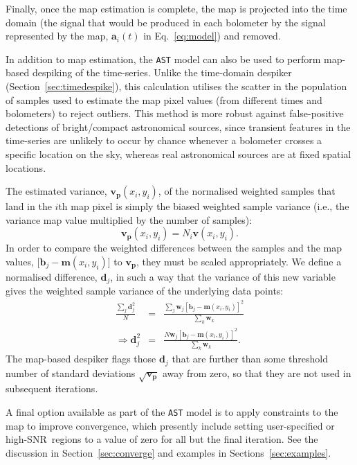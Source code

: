 \documentclass[useAMS,usenatbib,nofootinbib]{mn2e}
\newcommand{\snr}{SNR}
\newcommand{\model}[1]{\texttt{#1}}
\begin{document}
Finally, once the map estimation is complete, the map is projected
into the time domain (the signal that would be produced in each
bolometer by the signal represented by the map, $\mathbf{a}_i(t)$ in
Eq.~\ref{eq:model}) and removed.

In addition to map estimation, the \model{AST} model can also be used
to perform map-based despiking of the time-series. Unlike the
time-domain despiker (Section~\ref{sec:timedespike}), this calculation
utilises the scatter in the population of samples used to estimate the
map pixel values (from different times and bolometers) to reject
outliers. This method is more robust against false-positive detections
of bright/compact astronomical sources, since transient features in
the time-series are unlikely to occur by chance whenever a bolometer
crosses a specific location on the sky, whereas real astronomical
sources are at fixed spatial locations.

The estimated variance, $\mathbf{v_p}(x_i,y_i)$, of the normalised
weighted samples that land in the $i$th map pixel is simply the biased
weighted sample variance (i.e., the variance map value multiplied by
the number of samples):
%
\begin{equation}
  \mathbf{v_p}(x_i,y_i) = N_i \mathbf{v}(x_i,y_i).
\end{equation}
%
In order to compare the weighted differences between the samples and
the map values, [$\mathbf{b}_j - \mathbf{m}(x_i,y_i)$] to
$\mathbf{v_p}$, they must be scaled appropriately. We define a
normalised difference, $\mathbf{d}_j$, in such a way that the variance
of this new variable gives the weighted sample variance of the
underlying data points:
%
\begin{eqnarray}
  \frac{\sum_j \mathbf{d}_j^2}{N} &=&
  \frac{\sum_j \mathbf{w}_j [\mathbf{b}_j - \mathbf{m}(x_i,y_i)]^2}
       {\sum_k \mathbf{w}_k} \\
   \Rightarrow \mathbf{d}_j^2 &=& \frac{N \mathbf{w}_j [\mathbf{b}_j -
       \mathbf{m}(x_i,y_i)]^2}{ \sum_k \mathbf{w}_k} .
\end{eqnarray}
%
The map-based despiker flags those $\mathbf{d}_j$ that are further
than some threshold number of standard deviations
$\sqrt{\mathbf{v_p}}$ away from zero, so that they are not used in
subsequent iterations.

A final option available as part of the \model{AST} model is to apply
constraints to the map to improve convergence, which presently include
setting user-specified or high-\snr\ regions to a value of zero for
all but the final iteration. See the discussion in
Section~\ref{sec:converge} and examples in
Sections~\ref{sec:examples}.
\end{document}
